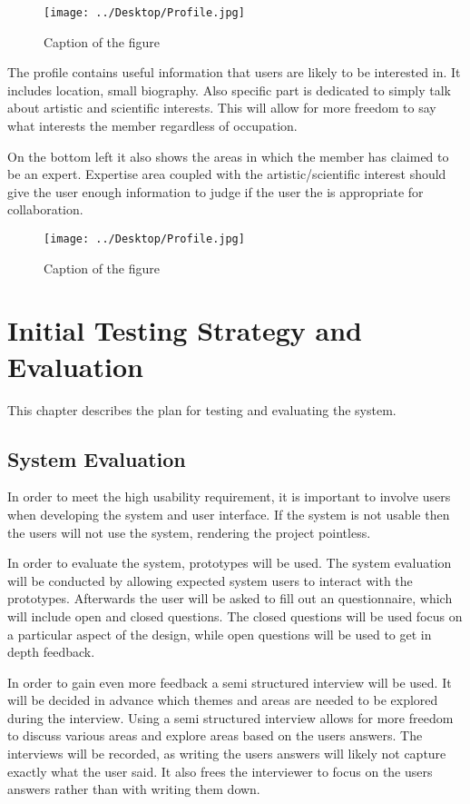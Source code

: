\documentclass[a4paper,oneside,11pt]{report}
\begin{document}
\begin{figure}[!ht]
\centering
\texttt{[image: ../Desktop/Profile.jpg]}
\caption{Caption of the figure}
\end{figure}
The profile contains useful information that users are likely to be interested in. It includes location, small biography. Also specific part is dedicated to simply talk about artistic and scientific interests. This will allow for more freedom to say what interests the member regardless of occupation.

On the bottom left it also shows the areas in which the member has claimed to be an expert. Expertise area coupled with the artistic/scientific interest should give the user enough information to judge if the user the is appropriate for collaboration.
\newpage

\begin{figure}[!ht]
\centering
\texttt{[image: ../Desktop/Profile.jpg]}
\caption{Caption of the figure}
\end{figure}

\chapter{Initial Testing Strategy and Evaluation}
This chapter describes the plan for testing and evaluating the system.
\section{System Evaluation}
In order to meet the high usability requirement, it is important to involve users when developing the system and user interface. If the system is not usable then the users will not use the system, rendering the project pointless.

In order to evaluate the system, prototypes will be used. The system evaluation will be conducted by allowing expected system users to interact with the prototypes. Afterwards the user will be asked to fill out an questionnaire, which will include open and closed questions. The closed questions will be used focus on a particular aspect of the design, while open questions will be used to get in depth feedback. 

In order to gain even more feedback a semi structured interview will be used. It will be decided in advance which themes and areas are needed to be explored during the interview. Using a semi structured interview allows for more freedom to discuss various areas and explore areas based on the users answers. The interviews will be recorded, as writing the users answers will likely not capture exactly what the user said. It also frees the interviewer to focus on the users answers rather than with writing them down.
\end{document}
